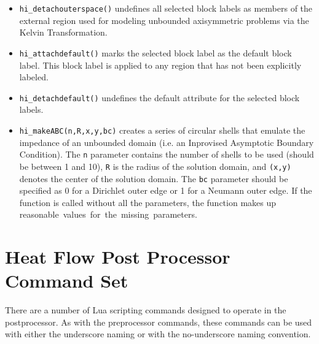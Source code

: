 \begin{itemize}
\item{\tt hi\_detachouterspace()} undefines all selected block labels
as members of the external region used for modeling unbounded axisymmetric
problems via the Kelvin Transformation.

\item{\tt hi\_attachdefault()} marks the
selected block label as the default block label.  This block label
is applied to any region that has not been explicitly labeled.

\item{\tt hi\_detachdefault()} undefines the default
attribute for the selected block labels.

\item{\tt hi\_makeABC(n,R,x,y,bc)} creates a series of circular shells that emulate the
impedance of an unbounded domain (i.e. an Inprovised Asymptotic Boundary
Condition).  The {\tt n} parameter contains the number of shells to be used
(should be between 1 and 10), {\tt R} is the radius of the solution domain, and
{\tt (x,y)} denotes the center of the solution domain.  The {\tt bc} parameter should
be specified as 0 for a Dirichlet outer edge or 1 for a Neumann outer edge.
If the function is called without all the parameters, the function makes up
reasonable values for the missing parameters. 

\end{itemize}

\section{Heat Flow Post Processor Command Set}

There are a number of Lua scripting commands designed to operate in
the postprocessor. As with the preprocessor commands, these
commands can be used with either the underscore naming or with the
no-underscore naming convention.


